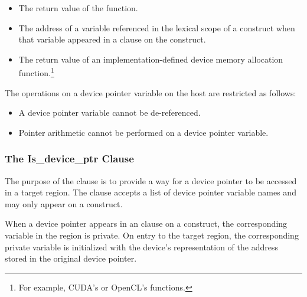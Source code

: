 \begin{itemize}

  \item The return value of the  function.

  \item The address of a variable referenced in the lexical scope of a
   construct when that variable appeared in a
   clause on the construct.

  \item The return value of an implementation-defined device memory allocation
  function.\footnote{For example, CUDA's \cite{CUDA-website} or OpenCL's
  \cite{OpenCL-website} functions.}


\end{itemize}

The operations on a device pointer variable on the host are restricted as
follows:

\begin{itemize}
  \item  A device pointer variable cannot be de-referenced.
  \item  Pointer arithmetic cannot be performed on a device pointer variable.
\end{itemize}

\subsubsection{The Is\_device\_ptr Clause}
\label{ssec:06.is_device_ptr-clause}

The purpose of the  clause is to provide a way for a device
pointer to be accessed in a target region.
The  clause accepts a list of device pointer variable names
and may only appear on a  construct.

When a device pointer appears in an  clause on a
 construct, the corresponding variable in the region is private.
On entry to the target region, the corresponding private variable is
initialized with the device's representation of the address stored in the
original device pointer.

